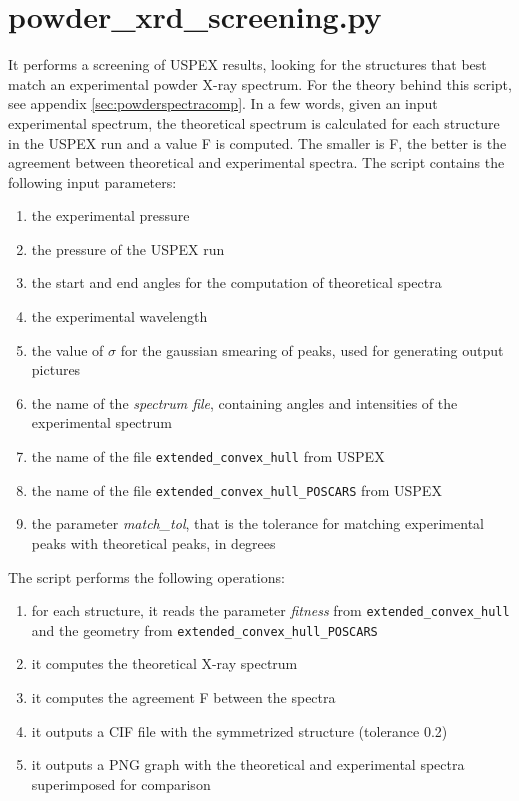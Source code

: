 \documentclass{article}
\begin{document}
\section{powder\_xrd\_screening.py}
It performs a screening of USPEX results, looking for the structures that best match an experimental powder X-ray spectrum. For the theory behind this script, see appendix \ref{sec:powderspectracomp}. In a few words, given an input experimental spectrum, the theoretical spectrum is calculated for each structure in the USPEX run and a value F is computed. The smaller is F, the better is the agreement between theoretical and experimental spectra. The script contains the following input parameters:
\begin{enumerate}
	\item the experimental pressure
	\item the pressure of the USPEX run
	\item the start and end angles for the computation of theoretical spectra
	\item the experimental wavelength
	\item the value of $\sigma$ for the gaussian smearing of peaks, used for generating output pictures
	\item the name of the \emph{spectrum file}, containing angles and intensities of the experimental spectrum
	\item the name of the file \texttt{extended\_convex\_hull} from USPEX
	\item the name of the file \texttt{extended\_convex\_hull\_POSCARS} from USPEX
	\item the parameter \emph{match\_tol}, that is the tolerance for matching experimental peaks with theoretical peaks, in degrees
\end{enumerate}
The script performs the following operations:
\begin{enumerate}
	\item for each structure, it reads the parameter \emph{fitness} from \texttt{extended\_convex\_hull} and the geometry from \texttt{extended\_convex\_hull\_POSCARS}
	\item it computes the theoretical X-ray spectrum
	\item it computes the agreement F between the spectra
	\item it outputs a CIF file with the symmetrized structure (tolerance 0.2)
	\item it outputs a PNG graph with the theoretical and experimental spectra superimposed for comparison
\end{enumerate}
\end{document}

